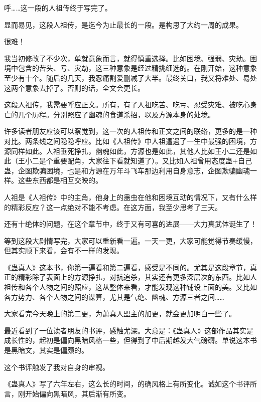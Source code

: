 \begin{this_body} %

呼……这一段的人祖传终于写完了。

显而易见，这段人祖传，是迄今为止最长的一段。是构思了大约一周的成果。

很难！

我当初修改了不少次，单就意象而言，就得慎重选择。比如困境、强弱、灾劫。困境中包含的苦头、亏、灾劫，这三种意象是经过精挑细选的。在刚开始，这种意象至少有十个。随后的几天，我忍痛割爱删减了大半。最终关口，我又将难处、易处这两个意象去掉了。否则的话，全文会更长。

这段人祖传，我需要呼应正文。所有，有了人祖吃苦、吃亏、忍受灾难、被吃心身亡的几个历程。分别照应了幽魂的食道杀招，以及方源本身的处境。

许多读者朋友应该可以察觉到，这一次的人祖传和正文之间的联络，更多的是一种对比。两条线之间隐隐呼应。比如《人祖传》中人祖遭遇了一生中最强的困境，方源同样如此。人祖垂死挣扎，幽魂如此，方源也是如此，其他人比如王小二还是如此（王小二是个重要配角，大家往下看就知道了）。又比如人祖曾用态度蛊+自己蛊，企图欺骗困境，也是和方源在万年斗飞车那边利用自身意志，企图欺骗幽魂一样。这些东西都是相互交映的。

人祖是《人祖传》中的主角，他身上的蛊虫在他和困境互动的情况下，又有什么样的精彩反应？这一点绝对不能不考虑。在这方面，我至少思考了三天。

还有十绝体的问题，在这个章节中，终于又有可喜的进展——大力真武体诞生了！

等到这段大剧情写完，大家可以重新看一遍。一天一更，大家可能觉得节奏缓慢，但其实顺下来看，会有不一样的发现。

《蛊真人》这本书，你第一遍看和第二遍看，感受是不同的。尤其是这段章节，真正的精彩除了表面上的方源挣扎，对抗追杀，其实还有更多深层次的东西。比如人祖传和各个人物之间的照应，这从整体来看，才能发现这种铺设上面的美。又比如各方势力、各个人物之间的谋算，尤其是气绝、幽魂、方源三者之间……

大家看完今天晚上的第二更，为萧真人盟主的加更，就会更加明白一些了。

最近看到了一位读者朋友的书评，感触尤深。大意是：《蛊真人》这部作品其实是成长性的，起初是偏向黑暗风格一些，但得到了中后期越发大气磅礴。单说这本书是黑暗文，其实是偏颇的。

这个书评触发了我对自身的审视。

《蛊真人》写了六年左右，这么长的时间，的确风格上有所变化。诚如这个书评所言，刚开始偏向黑暗风，其后渐有所变。


\end{this_body}
